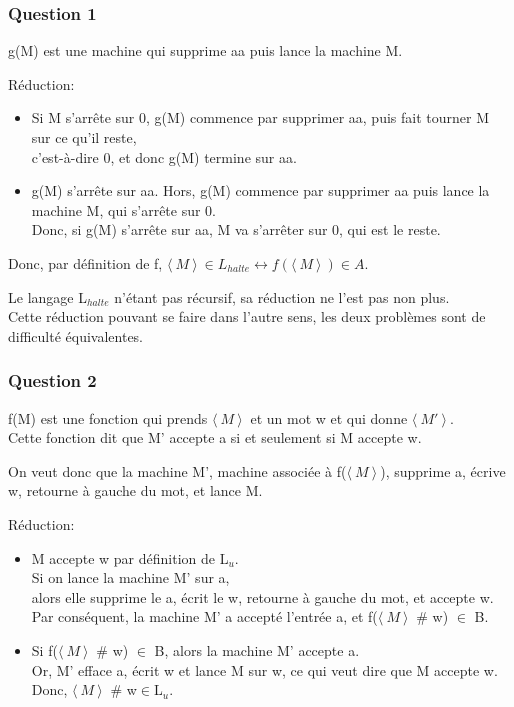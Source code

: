 \subsubsection{Question 1}

g(M) est une machine qui supprime aa puis lance la machine M.

Réduction:
\begin{itemize}
  \item Si M s'arrête sur 0, g(M) commence par supprimer aa, puis fait tourner M sur ce qu'il reste,\\
  c'est-à-dire 0, et donc g(M) termine sur aa.
  \item g(M) s'arrête sur aa. Hors, g(M) commence par supprimer aa puis lance la machine M, qui s'arrête sur 0.\\
  Donc, si g(M) s'arrête sur aa, M va s'arrêter sur 0, qui est le reste.
\end{itemize}

Donc, par définition de f, $\langle\ M\ \rangle \!\ \in L_{halte} \leftrightarrow f(\langle\ M\ \rangle \!\ )\in A$.

Le langage L$_{halte}$ n'étant pas récursif, sa réduction ne l'est pas non plus.\\
Cette réduction pouvant se faire dans l'autre sens, les deux problèmes sont de difficulté équivalentes.


\subsubsection{Question 2}

f(M) est une fonction qui prends $\langle\ M\ \rangle \!\ $ et un mot w et qui donne $\langle\ M'\ \rangle \!\ $.\\
Cette fonction dit que M' accepte a si et seulement si M accepte w.

On veut donc que la machine M', machine associée à f($\langle\ M\ \rangle \!\ $), supprime a, écrive w, retourne à gauche du mot, et lance M.

Réduction:
\begin{itemize}
  \item M accepte w par définition de L$_u$.\\
  Si on lance la machine M' sur a,\\
  alors elle supprime le a, écrit le w, retourne à gauche du mot, et accepte w.\\
  Par conséquent, la machine M' a accepté l'entrée a, et f($\langle\ M\ \rangle \!\ $ \# w) $\in$ B.
  \item Si f($\langle\ M\ \rangle \!\ $ \# w) $\in$ B, alors la machine M' accepte a.\\
  Or, M' efface a, écrit w et lance M sur w, ce qui veut dire que M accepte w.\\
  Donc, $\langle\ M\ \rangle \!\ $ \# w$\in$L$_u$.
\end{itemize}

